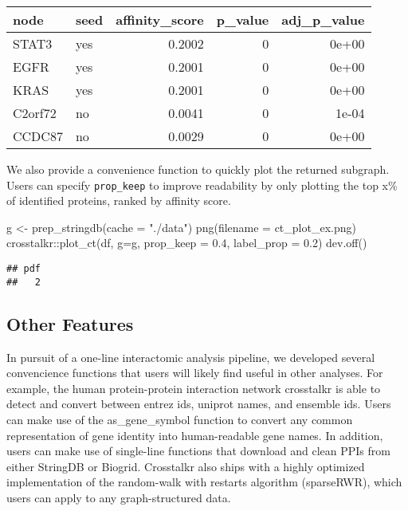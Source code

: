 \documentclass{article}
\newenvironment{Shaded}{\begin{snugshade}}{\end{snugshade}}
\newcommand{\AttributeTok}[1]{\textcolor[rgb]{0.77,0.63,0.00}{#1}}
\newcommand{\FloatTok}[1]{\textcolor[rgb]{0.00,0.00,0.81}{#1}}
\newcommand{\FunctionTok}[1]{\textcolor[rgb]{0.00,0.00,0.00}{#1}}
\newcommand{\NormalTok}[1]{#1}
\newcommand{\OtherTok}[1]{\textcolor[rgb]{0.56,0.35,0.01}{#1}}
\newcommand{\SpecialCharTok}[1]{\textcolor[rgb]{0.00,0.00,0.00}{#1}}
\newcommand{\StringTok}[1]{\textcolor[rgb]{0.31,0.60,0.02}{#1}}
\begin{document}
\begin{longtable}[]{@{}llrrr@{}}
\toprule
node & seed & affinity\_score & p\_value & adj\_p\_value \\
\midrule
\endhead
STAT3 & yes & 0.2002 & 0 & 0e+00 \\
EGFR & yes & 0.2001 & 0 & 0e+00 \\
KRAS & yes & 0.2001 & 0 & 0e+00 \\
C2orf72 & no & 0.0041 & 0 & 1e-04 \\
CCDC87 & no & 0.0029 & 0 & 0e+00 \\
\bottomrule
\end{longtable}

We also provide a convenience function to quickly plot the returned
subgraph. Users can specify \texttt{prop\_keep} to improve readability
by only plotting the top x\% of identified proteins, ranked by affinity
score.

\begin{Shaded}
\begin{Highlighting}[]
\NormalTok{g }\OtherTok{\textless{}{-}} \FunctionTok{prep\_stringdb}\NormalTok{(}\AttributeTok{cache =} \StringTok{"./data"}\NormalTok{)}
\FunctionTok{png}\NormalTok{(}\AttributeTok{filename =} \StringTok{\textquotesingle{}ct\_plot\_ex.png\textquotesingle{}}\NormalTok{)}
\NormalTok{crosstalkr}\SpecialCharTok{::}\FunctionTok{plot\_ct}\NormalTok{(df, }\AttributeTok{g=}\NormalTok{g, }\AttributeTok{prop\_keep =} \FloatTok{0.4}\NormalTok{, }\AttributeTok{label\_prop =} \FloatTok{0.2}\NormalTok{)}
\FunctionTok{dev.off}\NormalTok{()}
\end{Highlighting}
\end{Shaded}

\begin{verbatim}
## pdf 
##   2
\end{verbatim}

\hypertarget{other-features}{%
\subsection{Other Features}\label{other-features}}

In pursuit of a one-line interactomic analysis pipeline, we developed
several convencience functions that users will likely find useful in
other analyses. For example, the human protein-protein interaction
network crosstalkr is able to detect and convert between entrez ids,
uniprot names, and ensemble ids. Users can make use of the
as\_gene\_symbol function to convert any common representation of gene
identity into human-readable gene names. In addition, users can make use
of single-line functions that download and clean PPIs from either
StringDB or Biogrid. Crosstalkr also ships with a highly optimized
implementation of the random-walk with restarts algorithm (sparseRWR),
which users can apply to any graph-structured data.
\end{document}
